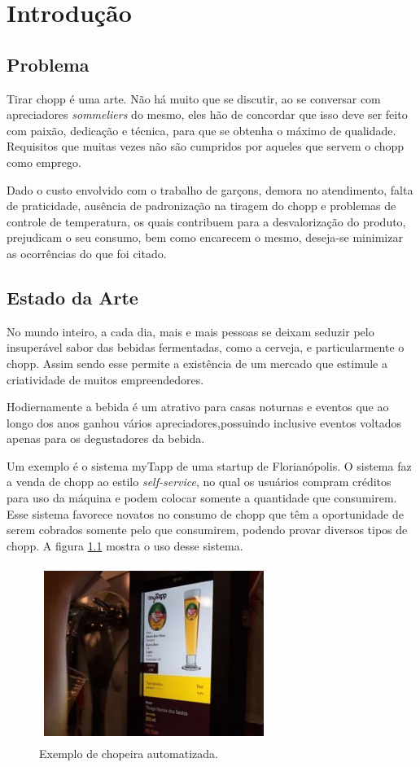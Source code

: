 \chapter[Introdução]{Introdução}

	\section[Problema]{Problema}

	Tirar chopp é uma arte.  Não há muito que se discutir, ao se conversar com 
	apreciadores \textit{sommeliers} do mesmo, eles hão de concordar que isso 
	deve ser feito com paixão, dedicação  e técnica,  para que se obtenha o máximo de 
	qualidade. Requisitos que muitas vezes não são cumpridos por aqueles que servem o
	chopp como emprego.
	
	Dado o custo  envolvido com o trabalho de garçons, demora no atendimento,
	falta de praticidade, ausência de padronização na tiragem do chopp e problemas de
	controle de temperatura, os quais contribuem para a desvalorização do produto,
	prejudicam o seu consumo, bem como encarecem o mesmo, deseja-se 
	minimizar as ocorrências do que  foi citado. 	
	
	\section[Estado da Arte]{Estado da Arte}
	
	No mundo inteiro, a cada dia, mais e mais pessoas se deixam seduzir pelo insuperável sabor das bebidas fermentadas, como a cerveja, e particularmente o chopp. Assim sendo esse permite a existência de um mercado que estimule a criatividade de muitos empreendedores.  

	Hodiernamente a bebida é um atrativo para casas noturnas e eventos que ao longo dos anos ganhou vários apreciadores,possuindo inclusive eventos voltados apenas para os degustadores da bebida. 

	Um exemplo é o sistema myTapp de uma startup de Florianópolis.  O sistema faz a venda de chopp ao estilo 
	\textit{self-service}, no qual os usuários compram créditos para uso da máquina e podem colocar somente a quantidade que 
	consumirem. Esse sistema favorece novatos no consumo de chopp que têm a oportunidade de serem cobrados somente 
	pelo que consumirem, podendo provar diversos tipos de chopp. A figura \ref{exemplo-chopp} mostra o uso desse sistema.

	\begin{figure}[H]
		\centering
		\includegraphics[scale= 0.9]{figuras/exemplo-chopp.png}
		\caption{Exemplo de chopeira automatizada.}
		\label{exemplo-chopp}
	\end{figure}

